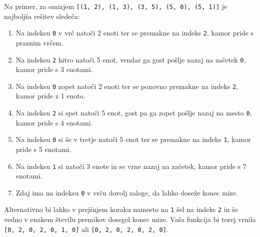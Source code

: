 \documentclass[arhiv]{../izpit}
\begin{document}
Na primer, za omizjem \verb|[(1, 2), (1, 3), (3, 5), (5, 0), (5, 1)]| je najboljša rešitev sledeča:
\begin{enumerate}
  \item Na indeksu \verb|0| v vrč natoči 2 enoti ter se premakne na indeks \verb|2|, kamor pride s praznim vrčem.
  \item Na indeksu \verb|2| hitro natoči 5 enot, vendar ga gost pošlje nazaj na začetek \verb|0|, kamor pride s 3 enotami.
  \item Na indeksu \verb|0| zopet natoči 2 enoti ter se ponovno premakne na indeks \verb|2|, kamor pride z 1 enoto.
  \item Na indeksu \verb|2| si spet natoči 5 enot, gost pa ga zopet pošlje nazaj na mesto \verb|0|, kamor pride s 4 enotami.
  \item Na indeksu \verb|0| si še v tretje natoči 5 enot ter se premakne na indeks \verb|1|, kamor pride s 5 enotami.
  \item Na indeksu \verb|1| si natoči 3 enote in se vrne nazaj na začetek, kamor pride s 7 enotami.
  \item Zdaj ima na indeksu \verb|0| v vrču dovolj zaloge, da lahko doseže konec mize.
\end{enumerate}
Alternativno bi lahko v prejšnjem koraku namesto na \verb|1| šel na indeks \verb|2| in še vedno v enakem številu premikov dosegel konec mize. Vaša funkcija bi torej vrnila \verb|[0, 2, 0, 2, 0, 1, 0]| ali \verb|[0, 2, 0, 2, 0, 2, 0]|.
\end{document}

